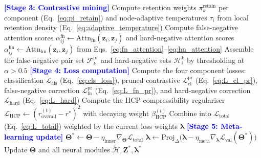 \documentclass[10pt]{article}
\theoremstyle{plain}
\theoremstyle{definition}
\begin{document}
\begin{algorithm}[ht]
\begin{algorithmic}[1]
      \EndIf
   \EndFor
   \State \textcolor{blue}{\textbf{[Stage 3: Contrastive mining]}}
   \State Compute retention weights $\pi_k^{\mathrm{retain}}$
          per component (Eq.~\eqref{eq:pi_retain}) and node-adaptive
          temperatures $\tau_i$ from local retention density (Eq.~\eqref{eq:adaptive_temperature})
   \State Compute false-negative attention scores
          $\alpha_{ij}^{\mathrm{fn}}\!\gets\!\mathrm{Attn}_{\mathrm{fn}}(\mathbf{z}_i,\mathbf{z}_j)$
          and hard-negative attention scores
          $\alpha_{ij}^{\mathrm{hn}}\!\gets\!\mathrm{Attn}_{\mathrm{hn}}(\mathbf{z}_i,\mathbf{z}_j)$
          from Eqs.~\eqref{eq:fn_attention}--\eqref{eq:hn_attention}
   \State Assemble the false-negative pair set $\mathcal{F}_k^{\mathrm{pr}}$
          and hard-negative sets $\mathcal{H}_i^k$ by thresholding at $\alpha\!>\!0.5$
   \State \textcolor{blue}{\textbf{[Stage 4: Loss computation]}}
   \State Compute the four component losses:
          classification $\mathcal{L}_{\mathrm{cls}}$ (Eq.~\eqref{eq:cls_loss}),
          pruned contrastive $\mathcal{L}_{\mathrm{cl}}^{\mathrm{pr}}$ (Eq.~\eqref{eq:L_cl_pr}),
          false-negative correction $\mathcal{L}_{\mathrm{fn}}^{\mathrm{pr}}$ (Eq.~\eqref{eq:L_fn_pr}),
          and hard-negative correction $\mathcal{L}_{\mathrm{hard}}$ (Eq.~\eqref{eq:L_hard})
   \State Compute the HCP compressibility regulariser
          $\mathcal{L}_{\mathrm{HCP}}\!\gets\!(r_{\mathrm{overall}}^{(t)}-r^\star)^2$
          with decaying weight $\beta_{\mathrm{HCP}}^{(t)}$
   \State Combine into $\mathcal{L}_{\mathrm{total}}$ (Eq.~\eqref{eq:L_total})
          weighted by the current loss weights $\boldsymbol{\lambda}$
   \State \textcolor{blue}{\textbf{[Stage 5: Meta-learning update]}}
   \State $\boldsymbol{\Theta}^*\!\gets\!\boldsymbol{\Theta}
          -\eta_{\mathrm{inner}}\nabla_{\boldsymbol{\Theta}}
          \mathcal{L}_{\mathrm{total}}$
      \State $\boldsymbol{\lambda}\gets
             \mathrm{Proj}_{\Delta}\!\big(\boldsymbol{\lambda}
             -\eta_{\mathrm{meta}}
             \nabla_{\boldsymbol{\lambda}}
             \mathcal{L}_{\mathrm{val}}(\boldsymbol{\Theta}^*)\big)$
   \EndIf
   \State Update $\boldsymbol{\Theta}$ and all neural modules
\EndFor
\State \Return $\widetilde{\mathcal{H}},\mathbf{Z}^*,
       \boldsymbol{\lambda}^*$
\end{algorithmic}
\end{algorithm}
\end{document}
